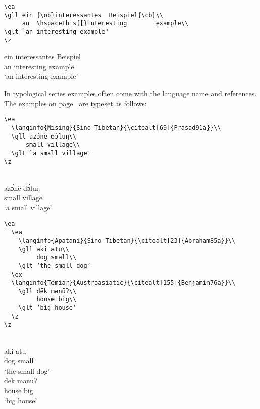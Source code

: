 \begin{verbatim}
\ea
\gll ein {\ob}interessantes  Beispiel{\cb}\\
     an  \hspaceThis{[}interesting        example\\
\glt `an interesting example'
\z 
\end{verbatim}

\ea
\def\exfont{\normalsize\itshape}
\gll ein {\ob}interessantes       Beispiel{\cb}\\
     an  \hspaceThis{[}interesting example\\
\glt `an interesting example'
\z 
 


In typological series examples often come with the language name and references. The examples on
page~\pageref{ex-typology} are typeset as follows:
\begin{verbatim}
\ea
  \langinfo{Mising}{Sino-Tibetan}{\citealt[69]{Prasad91a}}\\
  \gll azɔ́në dɔ́luŋ\\
      small village\\ 
  \glt `a small village' 
\z
\end{verbatim}
\ea
  \\
  \gll azɔ́në dɔ́luŋ\\
      small village\\ 
  \glt `a small village' 
\z

\newpage

\begin{verbatim}
\ea 
  \ea
    \langinfo{Apatani}{Sino-Tibetan}{\citealt[23]{Abraham85a}}\\
    \gll aki atu\\ 
         dog small\\ 
    \glt ‘the small dog’ 
  \ex
  \langinfo{Temiar}{Austroasiatic}{\citealt[155]{Benjamin76a}}\\ 
    \gll dēk mənūʔ\\
         house big\\
    \glt ‘big house’ 
  \z
\z
\end{verbatim}

\ea 
  \ea
    \\
    \gll aki atu\\ 
	dog small\\ 
    \glt ‘the small dog’ 
  \ex
  \\ 
    \gll dēk mənūʔ\\
	house big\\
    \glt ‘big house’ 
  \z
\z

